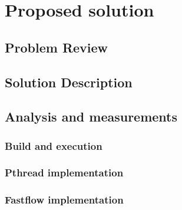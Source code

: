 \section{Proposed solution}
\subsection{Problem Review}
\subsection{Solution Description}
\subsection{Analysis and measurements}
\subsubsection{Build and execution}
\subsubsection{Pthread implementation}
\subsubsection{Fastflow implementation}